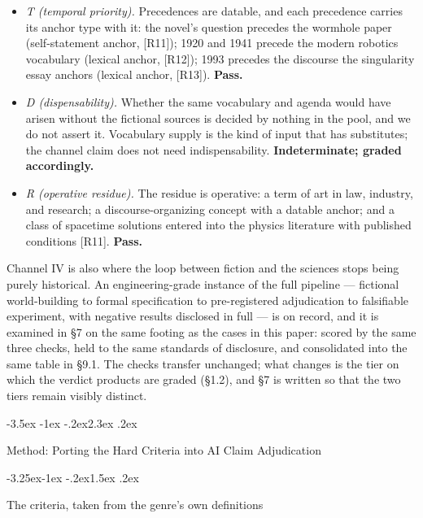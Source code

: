 \documentclass[11pt,a4paper]{article}
\makeatletter
\renewcommand\section{\@startsection{section}{1}{\z@}%
  {-3.5ex \@plus -1ex \@minus -.2ex}{2.3ex \@plus .2ex}%
  {\normalfont\Large\bfseries\raggedright}}
\renewcommand\subsection{\@startsection{subsection}{2}{\z@}%
  {-3.25ex\@plus -1ex \@minus -.2ex}{1.5ex \@plus .2ex}%
  {\normalfont\large\bfseries\raggedright}}
\makeatother
\begin{document}
\begin{itemize}[leftmargin=1.6em,itemsep=2pt,parsep=0pt,topsep=3pt]
\item \textit{T (temporal priority).} Precedences are datable, and each precedence carries its anchor type with it: the novel's question precedes the wormhole paper (self-statement anchor, [R11]); 1920 and 1941 precede the modern robotics vocabulary (lexical anchor, [R12]); 1993 precedes the discourse the singularity essay anchors (lexical anchor, [R13]). \textbf{Pass.}
\item \textit{D (dispensability).} Whether the same vocabulary and agenda would have arisen without the fictional sources is decided by nothing in the pool, and we do not assert it. Vocabulary supply is the kind of input that has substitutes; the channel claim does not need indispensability. \textbf{Indeterminate; graded accordingly.}
\item \textit{R (operative residue).} The residue is operative: a term of art in law, industry, and research; a discourse-organizing concept with a datable anchor; and a class of spacetime solutions entered into the physics literature with published conditions [R11]. \textbf{Pass.}
\end{itemize}

Channel IV is also where the loop between fiction and the sciences stops being purely historical. An engineering-grade instance of the full pipeline — fictional world-building to formal specification to pre-registered adjudication to falsifiable experiment, with negative results disclosed in full — is on record, and it is examined in §7 on the same footing as the cases in this paper: scored by the same three checks, held to the same standards of disclosure, and consolidated into the same table in §9.1. The checks transfer unchanged; what changes is the tier on which the verdict products are graded (§1.2), and §7 is written so that the two tiers remain visibly distinct.

\section{Method: Porting the Hard Criteria into AI Claim Adjudication}

\subsection{The criteria, taken from the genre's own definitions}
\end{document}
